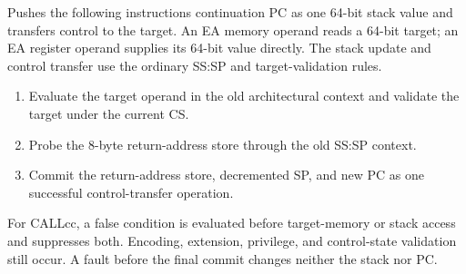 Pushes the following instruction\textquotesingle{}s continuation PC as one 64-bit stack value and transfers control to the target. An EA memory operand reads a 64-bit target; an EA register operand supplies its 64-bit value directly. The stack update and control transfer use the ordinary SS:SP and target-validation rules.

\begin{enumerate}
\item Evaluate the target operand in the old architectural context and validate the target under the current CS.
\item Probe the 8-byte return-address store through the old SS:SP context.
\item Commit the return-address store, decremented SP, and new PC as one successful control-transfer operation.
\end{enumerate}

For CALLcc, a false condition is evaluated before target-memory or stack access and suppresses both. Encoding,
extension, privilege, and control-state validation still occur. A fault before the final commit changes neither the
stack nor PC.

